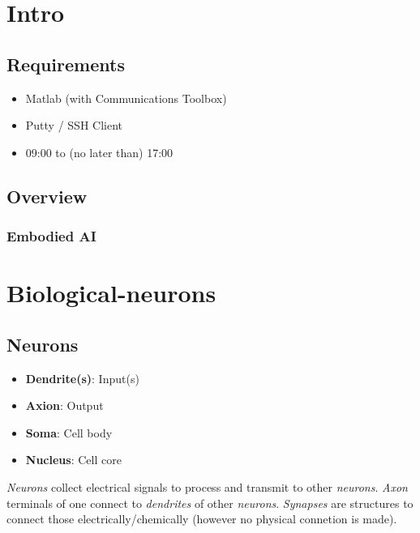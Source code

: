 \documentclass[
    fontsize      = 11pt,
    paper         = a4,
    twoside       = false,
    parskip       = half,
    pagesize      = false,
]{scrartcl}
\author{Robin Prillwitz}
\date{12 August 2022}
\providecommand{\tightlist}{%
  \setlength{\itemsep}{0pt}\setlength{\parskip}{0pt}}
\begin{document}
\tableofcontents

\clearpage
\newpage

\hypertarget{intro}{%
\section{Intro}\label{intro}}

\hypertarget{requirements}{%
\subsection{Requirements}\label{requirements}}

\begin{itemize}
\tightlist
\item
  Matlab (with Communications Toolbox)
\item
  Putty / SSH Client
\item
  09:00 to (no later than) 17:00
\end{itemize}

\hypertarget{overview}{%
\subsection{Overview}\label{overview}}

\hypertarget{embodied-ai}{%
\subsubsection{Embodied AI}\label{embodied-ai}}

\hypertarget{biological-neurons}{%
\section{Biological-neurons}\label{biological-neurons}}

\hypertarget{neurons}{%
\subsection{Neurons}\label{neurons}}

\begin{itemize}
\tightlist
\item
  \textbf{Dendrite(s)}: Input(s)
\item
  \textbf{Axion}: Output
\item
  \textbf{Soma}: Cell body
\item
  \textbf{Nucleus}: Cell core
\end{itemize}

\emph{Neurons} collect electrical signals to process and transmit to
other \emph{neurons}. \emph{Axon} terminals of one connect to
\emph{dendrites} of other \emph{neurons}. \emph{Synapses} are structures
to connect those electrically/chemically (however no physical connetion
is made).
\end{document}
